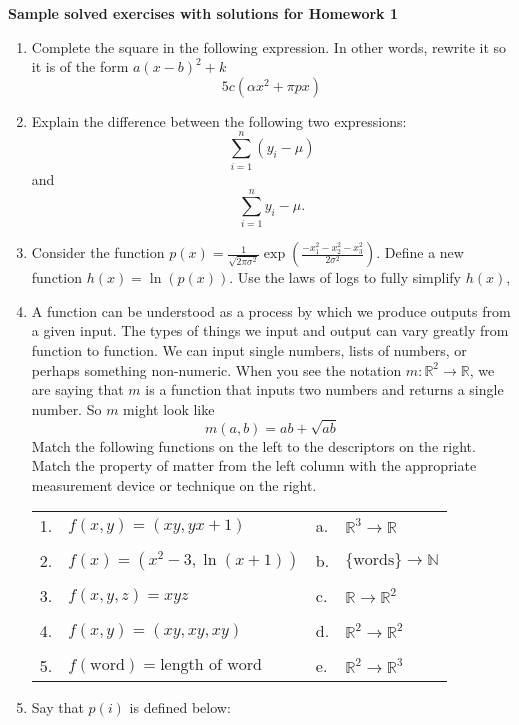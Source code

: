 \documentclass{article}
\newcommand{\R}{\mathbb{R}}
\newcommand{\N}{\mathbb{N}}
\begin{document}
\begin{center}
\textbf{
    Sample solved exercises with solutions for Homework 1}
\end{center}
    \begin{enumerate}
        \item Complete the square in the following expression. In other words, rewrite it so it is of the form $a(x-b)^2 + k$
        $$5c(\alpha x^2 + \pi p x)$$
        \item Explain the difference between the following two expressions:
        $$\sum_{i=1}^n (y_i - \mu)$$
        and 
        $$\sum_{i=1}^n y_i - \mu.$$
        \item Consider the function $\displaystyle p(x) = \frac{1}{\sqrt{2\pi \sigma^2}}\exp\left( \frac{-x_1^2-x_2^2-x_3^2}{2\sigma^2}\right)$. Define a new function $h(x) = \ln(p(x))$. Use the laws of logs to fully simplify $h(x)$,
        \item A function can be understood as a process by which we produce outputs from a given input.  The types of things we input and output can vary greatly from function to function.  We can input single numbers, lists of numbers, or perhaps something non-numeric. When you see the notation $m:\mathbb{R}^2 \to \mathbb{R}$, we are saying that $m$ is a function that inputs two numbers and returns a single number.  So $m$ might look like \[m(a,b)=ab+\sqrt{ab}\]
        Match the following functions on the left to the descriptors on the right.
        Match the property of matter from the left column with the appropriate measurement device or technique on the right.
\begin{center}
\begin{tabular}{llll}
1.  &   $f(x,y)=(xy,yx+1)$ &   a.       &   $\R^3\to \R$\\
&&&\\
2.  &   $f(x)=(x^2-3,\ln(x+1))$    &   b. & $\{\text{words}\}\to \N$  \\
&&&\\
3.  &   $f(x,y,z)=xyz$      &   c.  &   $\R\to\R^2$\\
&&&\\
4.  &   $f(x,y)=(xy,xy,xy)$      &   d. &   $\R^2\to \R^2$\\
&&&\\
5.  &   $f(\text{word})=\text{length of word}$       &   e. &   $\R^2\to \R^3$
\end{tabular}
\end{center}
    \item Say that $p(i)$ is defined below:

\end{enumerate}
\end{document}
